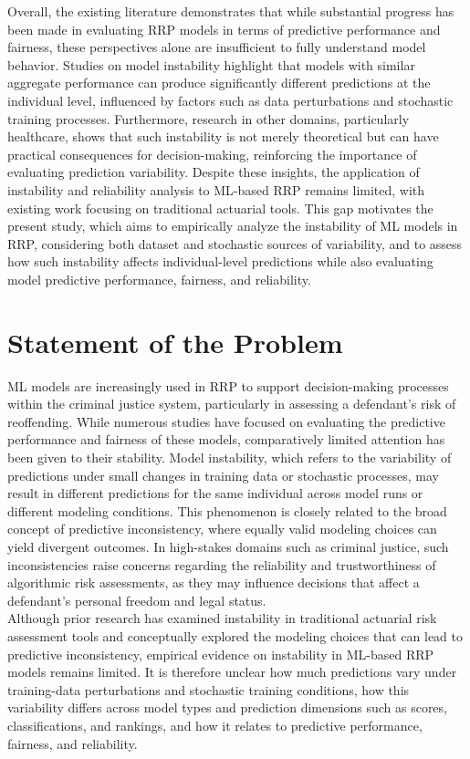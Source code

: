 \documentclass[12pt]{article}
\begin{document}
Overall, the existing literature demonstrates that while substantial progress has been made in evaluating RRP models in terms of predictive performance and fairness, these perspectives alone are insufficient to fully understand model behavior. Studies on model instability highlight that models with similar aggregate performance can produce significantly different predictions at the individual level, influenced by factors such as data perturbations and stochastic training processes. Furthermore, research in other domains, particularly healthcare, shows that such instability is not merely theoretical but can have practical consequences for decision-making, reinforcing the importance of evaluating prediction variability. Despite these insights, the application of instability and reliability analysis to ML-based RRP remains limited, with existing work focusing on traditional actuarial tools. This gap motivates the present study, which aims to empirically analyze the instability of ML models in RRP, considering both dataset and stochastic sources of variability, and to assess how such instability affects individual-level predictions while also evaluating model predictive performance, fairness, and reliability.

\section{Statement of the Problem} 
\tabto{2em} ML models are increasingly used in RRP to support decision-making processes within the criminal justice system, particularly in assessing a defendant's risk of reoffending. While numerous studies have focused on evaluating the predictive performance and fairness of these models, comparatively limited attention has been given to their stability. Model instability, which refers to the variability of predictions under small changes in training data or stochastic processes, may result in different predictions for the same individual across model runs or different modeling conditions. This phenomenon is closely related to the broad concept of predictive inconsistency, where equally valid modeling choices can yield divergent outcomes. In high-stakes domains such as criminal justice, such inconsistencies raise concerns regarding the reliability and trustworthiness of algorithmic risk assessments, as they may influence decisions that affect a defendant's personal freedom and legal status.\\

Although prior research has examined instability in traditional actuarial risk assessment tools and conceptually explored the modeling choices that can lead to predictive inconsistency, empirical evidence on instability in ML-based RRP models remains limited. It is therefore unclear how much predictions vary under training-data perturbations and stochastic training conditions, how this variability differs across model types and prediction dimensions such as scores, classifications, and rankings, and how it relates to predictive performance, fairness, and reliability.\\
\end{document}
